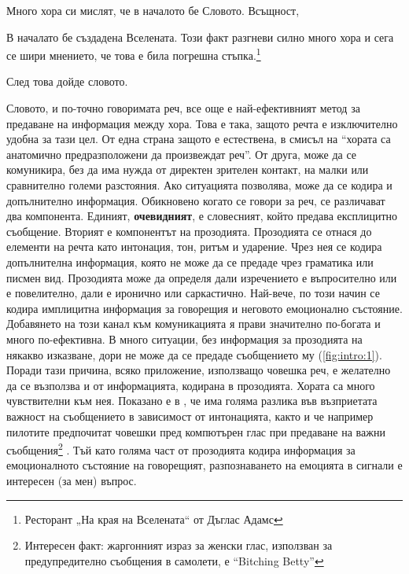 \documentclass[main.tex]{subfiles}
\begin{document}

Много хора си мислят, че в началото бе Словото. Всъщност, 
\begin{displayquote}
    В началато бе създадена Вселената. Този факт разгневи силно много хора и сега се шири мнението, че това е била погрешна стъпка.\footnote{Ресторант „На края на Вселената“ от Дъглас Адамс}
\end{displayquote}
    
След това дойде словото.

Словото, и по-точно говоримата реч, все още е най-ефективният метод за предаване на информация между хора. Това е така, защото речта е изключително удобна за тази цел. От една страна защото е естествена, в смисъл на ``хората са анатомично предразположени да произвеждат реч''. От друга, може да се комуникира, без да има нужда от директен зрителен контакт, на малки или сравнително големи разстояния. Ако ситуацията позволява, може да се кодира и допълнително информация. Обикновено когато се говори за реч, се различават два компонента. Единият, \textbf{очевидният}, е словесният, който предава експлицитно съобщение. Вторият е компонентът на прозодията. Прозодията се отнася до елементи на речта като интонация, тон, ритъм и ударение. Чрез нея се кодира допълнителна информация, която не може да се предаде чрез граматика или писмен вид. Прозодията може да определя дали изречението е въпросително или е повелително, дали е иронично или саркастично. Най-вече, по този начин се кодира имплицитна информация за говорещия и неговото емоционално състояние. Добавянето на този канал към комуникацията я прави значително по-богата и много по-ефективна. В много ситуации, без информация за прозодията на някакво изказване, дори не може да се предаде съобщението му (\autoref{fig:intro:1}). Поради тази причина, всяко приложение, използващо човешка реч, е желателно да се възползва и от информацията, кодирана в прозодията. Хората са много чувствителни към нея. Показано е в \cite{urgency}, че има голяма разлика във възприетата важност на съобщението в зависимост от интонацията, както и че например пилотите предпочитат човешки пред компютърен глас при предаване на важни съобщения\footnote{Интересен факт: жаргонният израз за женски глас, използван за предупредително съобщения в самолети, е ``Bitching Betty''} \cite{cockpit}. Тъй като голяма част от прозодията кодира информация за емоционалното състояние на говорещият, разпознаването на емоцията в сигнали е интересен (за мен) въпрос.
\end{document}
